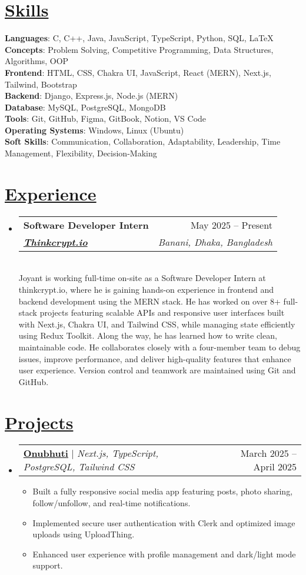 \documentclass[a4paper, 11pt]{article}
\makeatletter
\newcommand{\resumeItem}[1]{
  \item\small{
    {#1 \vspace{-2pt}}
  }
}
\newcommand{\resumeSection}[2]{
  \section{\textbf{\href{#1}{#2}}}
}
\newcommand{\resumeSubheading}[5]{
  \vspace{-2pt}\item
    \begin{tabularx}{\textwidth}[t]{X r}
      \textbf{#1} & #2 \\
      \textbf{\textit{\href{#3}{\small #4}}} & \textit{\small #5} \\
    \end{tabularx}\vspace{-7pt}
}
\newcommand{\resumeProjectHeading}[2]{
    \item
    \begin{tabular*}{0.97\textwidth}{l@{\extracolsep{\fill}}r}
      #1 & #2 \\
    \end{tabular*}\vspace{-7pt}
}
\newcommand{\resumeSubHeadingListStart}{\begin{itemize}[leftmargin=0in, label={}]}
\newcommand{\resumeSubHeadingListEnd}{\end{itemize}}
\newcommand{\resumeItemListStart}{\begin{itemize}}
\newcommand{\resumeItemListEnd}{\end{itemize}\vspace{-5pt}}
\makeatother
\begin{document}
\resumeSection{https://joyant.me/skills}{Skills}
 \begin{itemize}[leftmargin=0in, label={}]
    \small{\item{
        \textbf{Languages}{: C, C++, Java, JavaScript, TypeScript, Python, SQL, LaTeX} \\
        \textbf{Concepts}{: Problem Solving, Competitive Programming, Data Structures, Algorithms, OOP} \\
        \textbf{Frontend}{: HTML, CSS, Chakra UI, JavaScript, React (MERN), Next.js, Tailwind, Bootstrap} \\
        \textbf{Backend}{: Django, Express.js, Node.js (MERN)} \\
        \textbf{Database}{: MySQL, PostgreSQL, MongoDB} \\
        \textbf{Tools}{: Git, GitHub, Figma, GitBook, Notion, VS Code} \\
        \textbf{Operating Systems}{: Windows, Linux (Ubuntu)} \\
        \textbf{Soft Skills}{: Communication, Collaboration, Adaptability, Leadership, Time Management, Flexibility, Decision-Making}
    }}
 \end{itemize}

\resumeSection{https://joyant.me/experience}{Experience}
    \resumeSubHeadingListStart
        \resumeSubheading
            {Software Developer Intern}{May 2025 -- Present}
            {https://www.thinkcrypt.dev/}{Thinkcrypt.io}{Banani, Dhaka, Bangladesh } \\ \vspace{10pt}
            Joyant is working full-time on-site as a Software Developer Intern at thinkcrypt.io, where he is gaining hands-on experience in frontend and backend development using the MERN stack. He has worked on over 8+ full-stack projects featuring scalable APIs and responsive user interfaces built with Next.js, Chakra UI, and Tailwind CSS, while managing state efficiently using Redux Toolkit. Along the way, he has learned how to write clean, maintainable code. He collaborates closely with a four-member team to debug issues, improve performance, and deliver high-quality features that enhance user experience. Version control and teamwork are maintained using Git and GitHub.
    \resumeItemListEnd

\resumeSection{https://joyant.me/projects}{Projects}
  \resumeSubHeadingListStart
    \resumeProjectHeading
        {\textbf{\href{https://onubhuti.vercel.app/}{Onubhuti}} $|$ \emph{Next.js, TypeScript, PostgreSQL, Tailwind CSS}}{March 2025 -- April 2025}
        \resumeItemListStart
          \resumeItem{Built a fully responsive social media app featuring posts, photo sharing, follow/unfollow, and real-time notifications.}
          \resumeItem{Implemented secure user authentication with Clerk and optimized image uploads using UploadThing.}
          \resumeItem{Enhanced user experience with profile management and dark/light mode support.}
        \resumeItemListEnd
  \resumeSubHeadingListEnd
\end{document}
